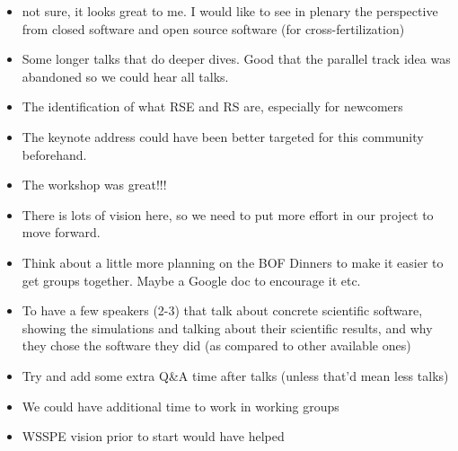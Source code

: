\begin{itemize}
\item not sure, it looks great to me. I would like to see in plenary the perspective from closed software and open source software (for cross-fertilization)
\item Some longer talks that do deeper dives.  Good that the parallel track idea was abandoned so we could hear all talks.
\item The identification of what RSE and RS are, especially for newcomers
\item The keynote address could have been better targeted for this community beforehand.
\item The workshop was great!!!
\item There is lots of vision here, so we need to put more effort in our project to move forward.
\item Think about a little more planning on the BOF Dinners to make it easier to get groups together. Maybe a Google doc to encourage it etc.
\item To have a few speakers (2-3) that talk about concrete scientific software, showing the simulations and talking about their scientific results, and why they chose the software they did (as compared to other available ones)
\item Try and add some extra Q\&A time after talks (unless that'd mean less talks)
\item We could have additional time to work in working groups
\item WSSPE vision prior to start would have helped
\end{itemize}


